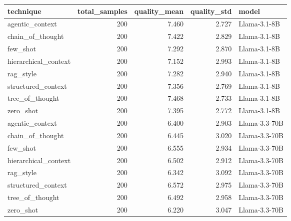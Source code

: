 \begin{tabular}{lrrrl}
\toprule
technique & total_samples & quality_mean & quality_std & model \\
\midrule
agentic_context & 200 & 7.460 & 2.727 & Llama-3.1-8B \\
chain_of_thought & 200 & 7.422 & 2.829 & Llama-3.1-8B \\
few_shot & 200 & 7.292 & 2.870 & Llama-3.1-8B \\
hierarchical_context & 200 & 7.152 & 2.993 & Llama-3.1-8B \\
rag_style & 200 & 7.282 & 2.940 & Llama-3.1-8B \\
structured_context & 200 & 7.356 & 2.769 & Llama-3.1-8B \\
tree_of_thought & 200 & 7.468 & 2.733 & Llama-3.1-8B \\
zero_shot & 200 & 7.395 & 2.772 & Llama-3.1-8B \\
agentic_context & 200 & 6.400 & 2.903 & Llama-3.3-70B \\
chain_of_thought & 200 & 6.445 & 3.020 & Llama-3.3-70B \\
few_shot & 200 & 6.555 & 2.934 & Llama-3.3-70B \\
hierarchical_context & 200 & 6.502 & 2.912 & Llama-3.3-70B \\
rag_style & 200 & 6.342 & 3.092 & Llama-3.3-70B \\
structured_context & 200 & 6.572 & 2.975 & Llama-3.3-70B \\
tree_of_thought & 200 & 6.492 & 2.958 & Llama-3.3-70B \\
zero_shot & 200 & 6.220 & 3.047 & Llama-3.3-70B \\
\bottomrule
\end{tabular}
